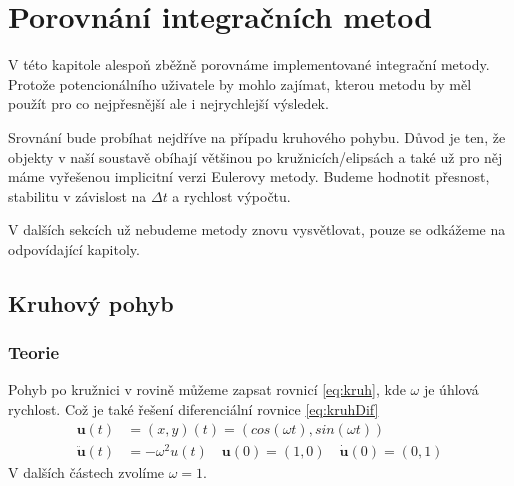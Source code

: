 \chapter{Porovnání integračních metod}
\label{chap:compMethods}
V této kapitole alespoň zběžně porovnáme implementované integrační metody. Protože potencionálního uživatele by mohlo zajímat, kterou metodu by měl použít pro co nejpřesnější ale i nejrychlejší výsledek.

Srovnání bude probíhat nejdříve na případu kruhového pohybu. Důvod je ten, že objekty v naší soustavě obíhají většinou po kružnicích/elipsách a také už pro něj máme vyřešenou implicitní verzi Eulerovy metody. Budeme hodnotit přesnost, stabilitu v závislost na $ \Delta t $ a rychlost výpočtu.

V dalších sekcích už nebudeme metody znovu vysvětlovat, pouze se odkážeme na odpovídající kapitoly.

\section{Kruhový pohyb}
\subsection{Teorie}
Pohyb po kružnici v rovině můžeme zapsat rovnicí \eqref{eq:kruh}, kde $\omega$ je úhlová rychlost. Což je také řešení diferenciální rovnice \eqref{eq:kruhDif}
\begin{align}
\label{eq:kruh}
\boldsymbol{u}(t) &= (x,y)(t)=(cos(\omega t),sin(\omega t))\\
\label{eq:kruhDif}
\ddot{\boldsymbol{u}}(t)&=-\omega^2u(t) \quad \boldsymbol{u}(0)=(1,0) \quad \dot{\boldsymbol{u}}(0)=(0,1)
\end{align}
V dalších částech zvolíme $ \omega = 1 $.
